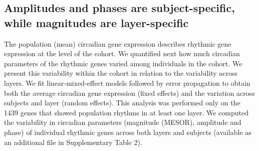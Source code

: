 

\subsection*{Amplitudes and phases are subject-specific, while magnitudes are layer-specific}
The population (mean) circadian gene expression describes rhythmic gene expression at the level of the cohort. We quantified next how much circadian parameters of the rhythmic genes varied among individuals in the cohort. We present this variability within the cohort in relation to the variability across layers.  We fit linear-mixed-effect models \cite{Hoffman2016} followed by error propagation to obtain both the average circadian gene expression (fixed effects) and the variation across subjects and layer (random effects). This analysis was performed only on the 1439 genes that showed population rhythms in at least one layer. We computed the variability in circadian parameters (magnitude (MESOR), amplitude and phase) of individual rhythmic genes across both layers and subjects (available as an additional file in Supplementary Table 2).

